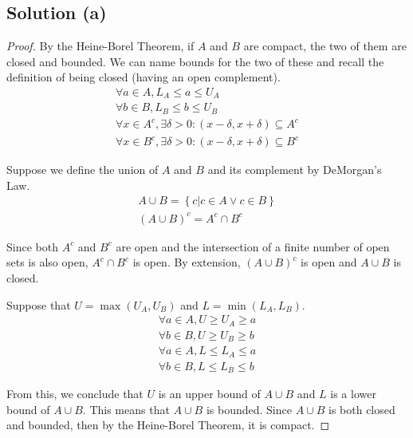 \documentclass[12pt]{report}
\begin{document}
    \subsection{Solution (a)}
        \begin{proof}
            By the Heine-Borel Theorem, if $A$ and $B$ are compact, the two of them are closed and bounded.
            We can name bounds for the two of these and recall the definition of being closed (having an open complement).
            \begin{gather}
                \forall a \in A, L_A \leq a \leq U_A\\
                \forall b \in B, L_B \leq b \leq U_B\\
                \forall x \in A^c, \exists \delta > 0 : (x - \delta, x + \delta) \subseteq A^c\\
                \forall x \in B^c, \exists \delta > 0 : (x - \delta, x + \delta) \subseteq B^c
            \end{gather}

            Suppose we define the union of $A$ and $B$ and its complement by DeMorgan's Law.
            \begin{gather}
                A \cup B = \left\{ c \vert c \in A \vee c \in B \right\}\\
                (A \cup B)^c = A^c \cap B^c
            \end{gather}

            Since both $A^c$ and $B^c$ are open and the intersection of a finite number of open sets is also open, $A^c \cap B^c$ is open.
            By extension, $(A \cup B)^c$ is open and $A \cup B$ is closed.

            Suppose that $U = \max(U_A, U_B)$ and $L = \min(L_A, L_B)$.
            \begin{gather}
                \forall a \in A, U \geq U_A \geq a\\
                \forall b \in B, U \geq U_B \geq b\\
                \forall a \in A, L \leq L_A \leq a\\
                \forall b \in B, L \leq L_B \leq b
            \end{gather}

            From this, we conclude that $U$ is an upper bound of $A \cup B$ and $L$ is a lower bound of $A \cup B$.
            This means that $A \cup B$ is bounded.
            Since $A \cup B$ is both closed and bounded, then by the Heine-Borel Theorem, it is compact.
        \end{proof}
\end{document}
